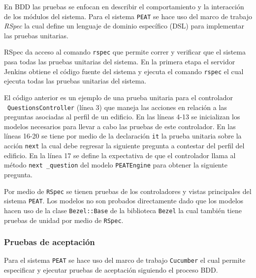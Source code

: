 En BDD las pruebas se enfocan en describir el comportamiento y la interacción
de los módulos del sistema. Para el sistema \texttt{PEAT} se hace uso del marco
de trabajo \textit{RSpec} la cual define un lenguaje de dominio específico (DSL)
para implementar las pruebas unitarias.

RSpec da acceso al comando \texttt{rspec} que permite correr y verificar
que el sistema pasa todas las pruebas unitarias del sistema. En la primera
etapa el servidor Jenkins obtiene el código fuente del sistema y ejecuta el
comando \texttt{rspec} el cual ejecuta todas las pruebas unitarias del sistema.



El código anterior es un ejemplo de una prueba unitaria para el controlador
\ \texttt{QuestionsController} (línea 3) que maneja las acciones en relación
a las preguntas asociadas al perfil de un edificio. En las líneas 4-13 se
inicializan los modelos necesarios para llevar a cabo las pruebas de este
controlador.
En las líneas 16-20 se tiene por medio de la declaración \texttt{it} la
prueba unitaria sobre la acción \texttt{next} la cual debe regresar
la siguiente pregunta a contestar del perfil del edificio. En la línea
17 se define la expectativa de que el controlador llama al método \texttt{next
  \_question} del modelo \texttt{PEATEngine} para obtener la siguiente pregunta.

Por medio de \texttt{RSpec} se tienen pruebas de los controladores y vistas
principales del sistema \texttt{PEAT}. Los modelos no son probados directamente
dado que los modelos hacen uso de la clase \texttt{Bezel::Base} de la biblioteca
\texttt{Bezel} la cual también tiene pruebas de unidad por medio de \texttt{RSpec}.

\subsubsection{Pruebas de aceptación}

Para el sistema \texttt{PEAT} se hace uso del marco de trabajo \texttt{Cucumber}
el cual permite especificar y ejecutar pruebas de aceptación siguiendo el proceso
BDD.

